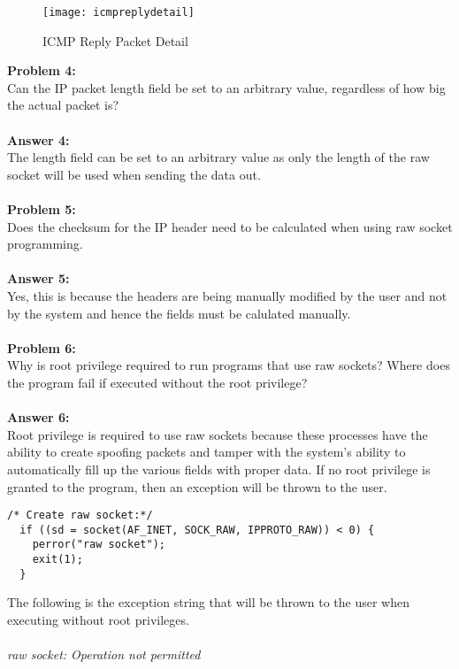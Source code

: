 \documentclass[a4paper,12pt]{article}
\begin{document}
\begin{figure}[H]
\centering
\texttt{[image: icmpreplydetail]}
\caption{ICMP Reply Packet Detail}
\label{fig:icmpreplydetail}
\end{figure}
\noindent
\textbf{Problem 4:}\\
Can the IP packet length field be set to an arbitrary value, regardless of how big the actual packet is?\\\\
\textbf{Answer 4:}\\
The length field can be set to an arbitrary value as only the length of the raw socket will be used when sending the data out.\\\\
\textbf{Problem 5:}\\
Does the checksum for the IP header need to be calculated when using raw socket programming.\\\\
\textbf{Answer 5:}\\
Yes, this is because the headers are being manually modified by the user and not by the system and hence the fields must be calulated manually.\\\\
\textbf{Problem 6:}\\
Why is root privilege required to run programs that use raw sockets? Where does the program fail if executed without the root privilege?\\\\
\textbf{Answer 6:}\\
Root privilege is required to use raw sockets because these processes have the ability to create spoofing packets and tamper with the system's ability to automatically fill up the various fields with proper data. If no root privilege is granted to the program, then an exception will be thrown to the user.
\begin{verbatim}
/* Create raw socket:*/
  if ((sd = socket(AF_INET, SOCK_RAW, IPPROTO_RAW)) < 0) {
    perror("raw socket");
    exit(1);
  }
\end{verbatim}
The following is the exception string that will be thrown to the user when executing without root privileges.\\\\
\textit{raw socket: Operation not permitted}
\end{document}
